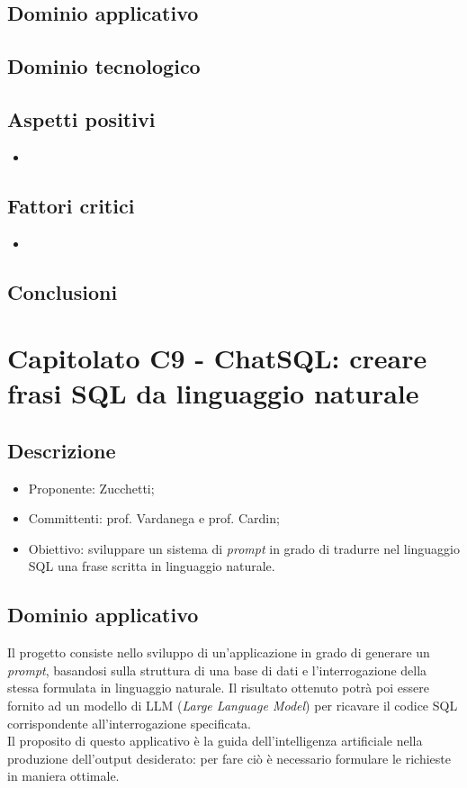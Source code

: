\subsection{Dominio applicativo}

\subsection{Dominio tecnologico}

\subsection{Aspetti positivi}
\begin{itemize}
    \setlength\itemsep{0em}
    \item 
\end{itemize}

\subsection{Fattori critici}
\begin{itemize}
    \setlength\itemsep{0em}
    \item 
\end{itemize}

\subsection{Conclusioni}


\section{Capitolato C9 - ChatSQL: creare frasi SQL da linguaggio naturale}
\subsection{Descrizione}
\begin{itemize}
    \setlength\itemsep{0em}
    \item Proponente: Zucchetti;
    \item Committenti: prof. Vardanega e prof. Cardin;
    \item Obiettivo: sviluppare un sistema di \textit{prompt} in grado di tradurre nel linguaggio SQL una frase scritta in linguaggio naturale.
\end{itemize}

\subsection{Dominio applicativo}
Il progetto consiste nello sviluppo di un'applicazione in grado di generare un \textit{prompt}, basandosi sulla struttura di una base di dati e l'interrogazione della stessa formulata in linguaggio naturale. Il risultato ottenuto potrà poi essere fornito ad un modello di LLM (\textit{Large Language Model}) per ricavare il codice SQL corrispondente all'interrogazione specificata. \\ Il proposito di questo applicativo è la guida dell'intelligenza artificiale nella produzione dell'output desiderato: per fare ciò è necessario formulare le richieste in maniera ottimale. 

